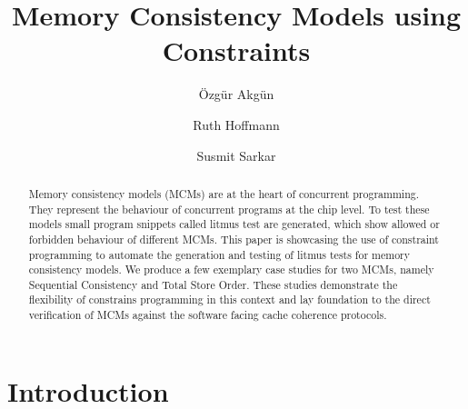 \documentclass[runningheads]{llncs}
\begin{document}
\title{Memory Consistency Models using Constraints}
\author{Özgür Akgün \and Ruth Hoffmann \and Susmit Sarkar}



\maketitle

\begin{abstract}
Memory consistency models (MCMs) are at the heart of concurrent programming.
They represent the behaviour of concurrent programs at the chip level.
To test these models small program snippets called litmus test are generated, which show allowed or forbidden behaviour of different MCMs.
This paper is showcasing the use of constraint programming to automate the generation and testing of litmus tests for memory consistency models.
We produce a few exemplary case studies for two MCMs, namely Sequential Consistency and Total Store Order.
These studies demonstrate the flexibility of constrains programming in this context and lay foundation to the direct verification of MCMs against the software facing cache coherence protocols.

\end{abstract}
%
%

\section{Introduction}
\end{document}
